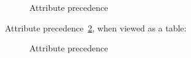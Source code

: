 \begin{figure}[ht!]
  \caption{Attribute precedence}
  \label{fig:overview_chef_attributes_precedence}
\end{figure}

Attribute precedence~\ref{fig:overview_chef_attributes_table}, when viewed as a table:

\begin{figure}[ht!]
  \caption{Attribute precedence}
  \label{fig:overview_chef_attributes_table}
\end{figure}